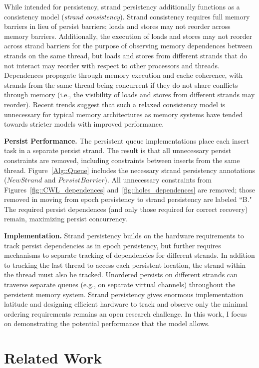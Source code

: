 While intended for persistency, strand persistency additionally functions as a consistency model (\emph{strand consistency}).
Strand consistency requires full memory barriers in lieu of persist barriers; loads and stores may not reorder across memory barriers.
Additionally, the execution of loads and stores may not reorder across strand barriers for the purpose of observing memory dependences between strands on the same thread, but loads and stores from different strands that do not interact may reorder with respect to other processors and threads.
Dependences propagate through memory execution and cache coherence, with strands from the same thread being concurrent if they do not share conflicts through memory (i.e., the visibility of loads and stores from different strands may reorder).
Recent trends suggest that such a relaxed consistency model is unnecessary for typical memory architectures as memory systems have tended towards stricter models with improved performance.

\textbf{Persist Performance.}
The persistent queue implementations place each insert task in a separate persist strand.
The result is that all unnecessary persist constraints are removed, including constraints between inserts from the same thread.
Figure~\ref{Alg::Queue} includes the necessary strand persistency annotations ($NewStrand$ and $PersistBarrier$).
All unnecessary constraints from Figures~\ref{fig::CWL_dependences} and~\ref{fig::holes_dependences} are removed; those removed in moving from epoch persistency to strand persistency are labeled ``B."
The required persist dependences (and only those required for correct recovery) remain, maximizing persist concurrency.

\textbf{Implementation.}
Strand persistency builds on the hardware requirements to track persist dependencies as in epoch persistency, but further requires mechanisms to separate tracking of dependencies for different strands.
In addition to tracking the last thread to access each persistent location, the strand within the thread must also be tracked.
Unordered persists on different strands can traverse separate queues (e.g., on separate virtual channels) throughout the persistent memory system.
Strand persistency gives enormous implementation latitude and designing efficient hardware to track and observe only the minimal ordering requirements remains an open research challenge.
In this work, I focus on demonstrating the potential performance that the model allows.

\section{Related Work}
\label{sec:PersistencyModels:RelatedWork}

